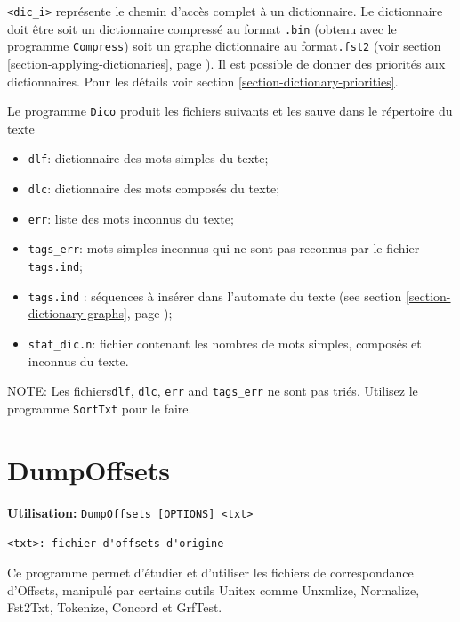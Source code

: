 \bigskip
\noindent \verb+<dic_i>+ représente le chemin d’accès complet à un dictionnaire. Le dictionnaire
doit être soit un dictionnaire compressé au format \verb+.bin+ (obtenu avec le programme
	\verb+Compress+) soit un graphe dictionnaire au format\verb+.fst2+ (voir section
\ref{section-applying-dictionaries}, page \pageref{section-applying-dictionaries}).
	 Il est possible de donner des priorités aux dictionnaires. Pour
	les détails voir section \ref{section-dictionary-priorities}.

\bigskip
\noindent Le programme \verb+Dico+ produit les fichiers suivants et les sauve dans le répertoire du
texte

\begin{itemize}
  \item \verb+dlf+: dictionnaire des mots simples du texte;
  \item \verb+dlc+: dictionnaire des mots composés du texte;
  \item \verb+err+: liste des mots inconnus du texte;
  \item \verb+tags_err+: mots simples inconnus qui ne sont pas reconnus par le fichier
  	  \verb+tags.ind+;
  \item \verb+tags.ind+ : séquences à insérer dans l'automate du texte
  (see section \ref{section-dictionary-graphs}, page \pageref{section-dictionary-graphs});
  \item \verb+stat_dic.n+: fichier contenant les nombres de mots simples, composés et inconnus du
  	  texte.
\end{itemize}

\bigskip
\noindent NOTE: Les fichiers\verb+dlf+, \verb+dlc+, \verb+err+ and \verb+tags_err+ ne sont pas triés. Utilisez le programme \verb+SortTxt+ pour le faire.



\section{DumpOffsets}
\label{section-DumpOffsets}
\textbf{Utilisation:} \verb+DumpOffsets [OPTIONS] <txt>+

\bigskip
\noindent\verb+<txt>: fichier d'offsets d'origine+

\bigskip
\noindent Ce programme permet d'étudier et d'utiliser les fichiers de correspondance d'Offsets, manipulé par
certains outils Unitex comme Unxmlize, Normalize, Fst2Txt, Tokenize, Concord et GrfTest.


